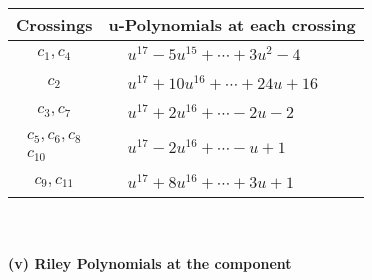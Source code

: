\documentclass[1p]{elsarticle_modified}
\theoremstyle{definition}
\begin{document}
\begin{tabular}{m{50pt}|m{274pt}}
Crossings & \hspace{64pt}u-Polynomials at each crossing \\
\hline $$\begin{aligned}c_{1},c_{4}\end{aligned}$$&$\begin{aligned}
&u^{17}-5 u^{15}+\cdots+3 u^2-4
\end{aligned}$\\
\hline $$\begin{aligned}c_{2}\end{aligned}$$&$\begin{aligned}
&u^{17}+10 u^{16}+\cdots+24 u+16
\end{aligned}$\\
\hline $$\begin{aligned}c_{3},c_{7}\end{aligned}$$&$\begin{aligned}
&u^{17}+2 u^{16}+\cdots-2 u-2
\end{aligned}$\\
\hline $$\begin{aligned}c_{5},c_{6},c_{8}\\c_{10}\end{aligned}$$&$\begin{aligned}
&u^{17}-2 u^{16}+\cdots- u+1
\end{aligned}$\\
\hline $$\begin{aligned}c_{9},c_{11}\end{aligned}$$&$\begin{aligned}
&u^{17}+8 u^{16}+\cdots+3 u+1
\end{aligned}$\\
\hline
\end{tabular}\\~\\
\newpage\renewcommand{\arraystretch}{1}
\flushleft \textbf{(v) Riley Polynomials at the component}\newline \\
\end{document}
